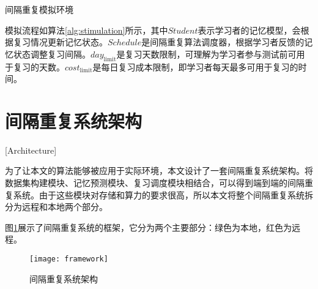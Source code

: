 \begin{algorithm}[htbp]
\caption{间隔重复模拟环境}
\label{alg:stimulation}
\end{algorithm}

模拟流程如算法\ref{alg:stimulation}所示，其中$Student$表示学习者的记忆模型，会根据复习情况更新记忆状态。$Schedule$是间隔重复算法调度器，根据学习者反馈的记忆状态调整复习间隔。$day_\mathrm{limit}$是复习天数限制，可理解为学习者参与测试前可用于复习的天数。$cost_\mathrm{limit}$是每日复习成本限制，即学习者每天最多可用于复习的时间。

\section{间隔重复系统架构}[Architecture]

为了让本文的算法能够被应用于实际环境，本文设计了一套间隔重复系统架构。将数据集构建模块、记忆预测模块、复习调度模块相结合，可以得到端到端的间隔重复系统。由于这些模块对存储和算力的要求很高，所以本文将整个间隔重复系统拆分为远程和本地两个部分。

图\ref{fig:framework}展示了间隔重复系统的框架，它分为两个主要部分：绿色为本地，红色为远程。

\begin{figure}[htbp]
\centering
\texttt{[image: framework]}
\caption{间隔重复系统架构}
\label{fig:framework}
\end{figure}


